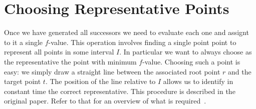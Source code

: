 \section{Choosing Representative Points}
\label{sec::representatives}

Once we have generated all successors we need to evaluate
each one and assignt to it a single $f$-value. This operation
involves finding a single point point to represent all points
in some interval $I$. In particular we want to always choose
as the representative the point with minimum $f$-value.
Choosing such a point is easy:
we simply draw a straight line between the associated root 
point $r$ and the target point $t$. The position of the line 
relative to $I$ allows us to identify in constant time
the correct representative.
This procedure is described in the original paper. Refer to 
that for an overview of what is required~\cite{haraborG13}.

